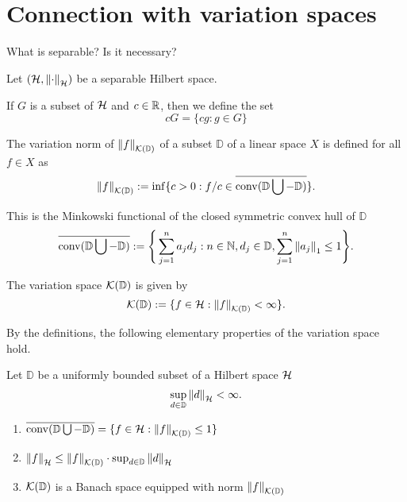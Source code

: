 \section{Connection with variation spaces}
\label{sec:fourier_variation_space}

What is separable? Is it necessary?

Let $(\mathcal{H}, \left\| \cdot \right\|_{\mathcal{H}})$ be a separable Hilbert space.

If $G$ is a subset of $\mathcal{H}$ and $c \in \mathbb{R}$, then we define the set
\begin{equation}
    cG = \{cg: g \in G\}
\end{equation}


\begin{definition}
    The variation norm of $\left\| {f} \right\|_{\mathcal{K}({\mathbb{D}})}$ of a subset $\mathbb{D}$ of
    a linear space $X$ is defined for all $f \in X$ as
    \begin{equation}
        \left\| {f} \right\|_{\mathcal{K}({\mathbb{D}})} := \inf \{
            c > 0: f/c \in \overline{\operatorname*{conv}(\mathbb{D} \bigcup - \mathbb{D})}
        \}.
    \end{equation}

    This is the Minkowski functional of the closed symmetric convex hull of $\mathbb{D}$
    \begin{equation}
        \overline{\operatorname*{conv}(\mathbb{D} \bigcup - \mathbb{D})} := \Bigg\{ 
            \sum_{j=1}^n a_j d_j: n \in \mathbb{N}, d_j \in \mathbb{D}, 
            \sum_{j=1}^n \left\| a_j \right\|_1 \leq 1
        \Bigg\}.
    \end{equation}
\end{definition}

\begin{definition}
    The variation space $\mathcal{K}({\mathbb{D}})$ is given by
    \begin{equation}
        \mathcal{K}({\mathbb{D}}) := \{ 
            f \in \mathcal{H}: \left\| {f} \right\|_{\mathcal{K}({\mathbb{D}})} < \infty
        \}.
    \end{equation}
\end{definition}

By the definitions, the following elementary properties of the variation space
hold.
\begin{proposition}
    \label{prop:spaceVar_properties}
    Let $\mathbb{D}$ be a uniformly bounded subset of a Hilbert space $\mathcal{H}$
    \begin{equation}
        \sup_{d\in\mathbb{D}} \left\| d \right\|_{\mathcal{H}} < \infty.
    \end{equation}
    \begin{enumerate}
        \item $\overline{\operatorname*{conv}(\mathbb{D} \bigcup - \mathbb{D})} = \{
            f\in\mathcal{H}: \left\| {f} \right\|_{\mathcal{K}({\mathbb{D}})} \leq 1
        \}$
        \item $\left\| f \right\|_{\mathcal{H}} \leq \left\| {f} \right\|_{\mathcal{K}({\mathbb{D}})} \cdot
        \sup_{d\in\mathbb{D}} \left\| d \right\|_{\mathcal{H}}$
        \item $\mathcal{K}({\mathbb{D}})$ is a Banach space equipped with norm
        $\left\| {f} \right\|_{\mathcal{K}({\mathbb{D}})}$
    \end{enumerate}
\end{proposition}

